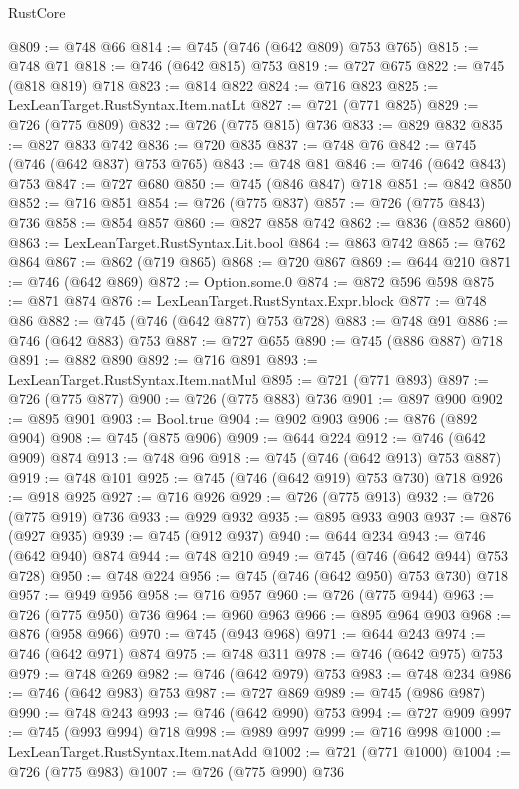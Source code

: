 \begin{lexlean}{RustCore}
\begin{coremodule}
@809 := @748 @66
@814 := @745 (@746 (@642 @809) @753 @765)
@815 := @748 @71
@818 := @746 (@642 @815) @753
@819 := @727 @675
@822 := @745 (@818 @819) @718
@823 := @814 @822
@824 := @716 @823
@825 := LexLeanTarget.RustSyntax.Item.natLt
@827 := @721 (@771 @825)
@829 := @726 (@775 @809)
@832 := @726 (@775 @815) @736
@833 := @829 @832
@835 := @827 @833 @742
@836 := @720 @835
@837 := @748 @76
@842 := @745 (@746 (@642 @837) @753 @765)
@843 := @748 @81
@846 := @746 (@642 @843) @753
@847 := @727 @680
@850 := @745 (@846 @847) @718
@851 := @842 @850
@852 := @716 @851
@854 := @726 (@775 @837)
@857 := @726 (@775 @843) @736
@858 := @854 @857
@860 := @827 @858 @742
@862 := @836 (@852 @860)
@863 := LexLeanTarget.RustSyntax.Lit.bool
@864 := @863 @742
@865 := @762 @864
@867 := @862 (@719 @865)
@868 := @720 @867
@869 := @644 @210
@871 := @746 (@642 @869)
@872 := Option.some.{0}
@874 := @872 @596 @598
@875 := @871 @874
@876 := LexLeanTarget.RustSyntax.Expr.block
@877 := @748 @86
@882 := @745 (@746 (@642 @877) @753 @728)
@883 := @748 @91
@886 := @746 (@642 @883) @753
@887 := @727 @655
@890 := @745 (@886 @887) @718
@891 := @882 @890
@892 := @716 @891
@893 := LexLeanTarget.RustSyntax.Item.natMul
@895 := @721 (@771 @893)
@897 := @726 (@775 @877)
@900 := @726 (@775 @883) @736
@901 := @897 @900
@902 := @895 @901
@903 := Bool.true
@904 := @902 @903
@906 := @876 (@892 @904)
@908 := @745 (@875 @906)
@909 := @644 @224
@912 := @746 (@642 @909) @874
@913 := @748 @96
@918 := @745 (@746 (@642 @913) @753 @887)
@919 := @748 @101
@925 := @745 (@746 (@642 @919) @753 @730) @718
@926 := @918 @925
@927 := @716 @926
@929 := @726 (@775 @913)
@932 := @726 (@775 @919) @736
@933 := @929 @932
@935 := @895 @933 @903
@937 := @876 (@927 @935)
@939 := @745 (@912 @937)
@940 := @644 @234
@943 := @746 (@642 @940) @874
@944 := @748 @210
@949 := @745 (@746 (@642 @944) @753 @728)
@950 := @748 @224
@956 := @745 (@746 (@642 @950) @753 @730) @718
@957 := @949 @956
@958 := @716 @957
@960 := @726 (@775 @944)
@963 := @726 (@775 @950) @736
@964 := @960 @963
@966 := @895 @964 @903
@968 := @876 (@958 @966)
@970 := @745 (@943 @968)
@971 := @644 @243
@974 := @746 (@642 @971) @874
@975 := @748 @311
@978 := @746 (@642 @975) @753
@979 := @748 @269
@982 := @746 (@642 @979) @753
@983 := @748 @234
@986 := @746 (@642 @983) @753
@987 := @727 @869
@989 := @745 (@986 @987)
@990 := @748 @243
@993 := @746 (@642 @990) @753
@994 := @727 @909
@997 := @745 (@993 @994) @718
@998 := @989 @997
@999 := @716 @998
@1000 := LexLeanTarget.RustSyntax.Item.natAdd
@1002 := @721 (@771 @1000)
@1004 := @726 (@775 @983)
@1007 := @726 (@775 @990) @736

\end{coremodule}
\end{lexlean}
